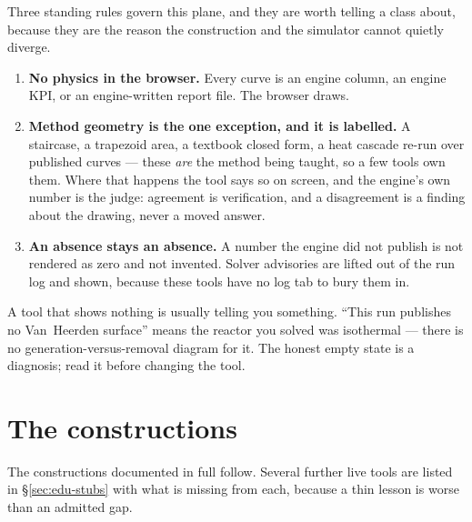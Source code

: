 \documentclass[11pt,a4paper]{article}
\begin{document}
Three standing rules govern this plane, and they are worth telling a class
about, because they are the reason the construction and the simulator
cannot quietly diverge.

\begin{enumerate}[leftmargin=*,nosep,topsep=2pt]
  \item \textbf{No physics in the browser.}  Every curve is an engine
        column, an engine KPI, or an engine-written report file.  The
        browser draws.
  \item \textbf{Method geometry is the one exception, and it is
        labelled.}  A staircase, a trapezoid area, a textbook closed form,
        a heat cascade re-run over published curves --- these \emph{are}
        the method being taught, so a few tools own them.  Where that
        happens the tool says so on screen, and the engine's own number is
        the judge: agreement is verification, and a disagreement is a
        finding about the drawing, never a moved answer.
  \item \textbf{An absence stays an absence.}  A number the engine did not
        publish is not rendered as zero and not invented.  Solver
        advisories are lifted out of the run log and shown, because these
        tools have no log tab to bury them in.
\end{enumerate}

\begin{pitfall}
A tool that shows nothing is usually telling you something.  ``This run
publishes no Van~Heerden surface'' means the reactor you solved was
isothermal --- there is no generation-versus-removal diagram for it.  The
honest empty state is a diagnosis; read it before changing the tool.
\end{pitfall}

\section{The constructions}\label{sec:edu-tools}

The constructions documented in full follow.  Several further live tools
are listed in \S\ref{sec:edu-stubs} with what is missing from each,
because a thin lesson is worse than an admitted gap.
\end{document}
